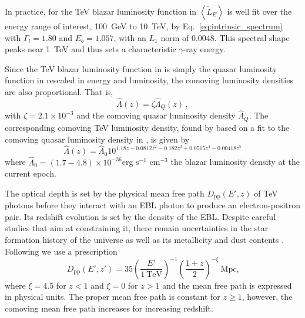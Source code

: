 \documentclass[numberedappendix]{emulateapj}
\begin{document}
In practice, for the TeV blazar luminosity function in
\citet{2014ApJ...790..137B} $\left< \tilde{L}_E \right>$ is well fit
over the energy range of interest, 100~GeV to 10~TeV, by
Eq.~\eqref{eq:intrinsic_spectrum} with $\Gamma_l=1.80$ and $E_b=1.057$,
with an $L_1$ norm of 0.0048.  This spectral shape peaks near 1~TeV
and thus sets a characteristic $\gamma$-ray energy.

Since the TeV blazar luminosity function in
\citet{2014ApJ...790..137B} is simply the quasar luminosity function
in \citet{2007ApJ...654..731H} rescaled in energy and luminosity, the
comoving luminosity densities are also proportional.  That is,
\begin{equation}
\hat{\Lambda}(z) = \zeta \hat{\Lambda}_Q(z)\,,
\end{equation}
with $\zeta=2.1\times 10^{-3}$ and the comoving quasar luminosity
density $\hat{\Lambda}_Q$. The corresponding comoving TeV luminosity
density, found by \citet{2012ApJ...752...23C} based on a fit to the
comoving quasar luminosity density in \citet{2007ApJ...654..731H}, is
given by
\begin{equation}
\label{eq:phi_quasar}
\hat{\Lambda}(z)=\hat{\Lambda}_0 10^{1.18 z - 0.0812 z^2 - 0.182 z^3 + 0.0515 z^4 - 0.00418 z^5} 
\end{equation}
where 
$\hat{\Lambda}_0=(1.7-4.8)\times 10^{-36}$erg s$^{-1}$ cm$^{-3}$ the
blazar luminosity density at the current epoch. 



The optical depth is set by the physical mean free path $D_\mathrm{pp}(E',z)$ of TeV photons before they interact with an EBL photon to produce an electron-positron pair. Its redshift evolution is set by the density of the EBL. Despite careful studies that aim at constraining it, there remain uncertainties in the star formation history of the universe as well as its metallicity and dust contents \citep[see, e.g.][]{2008A&A...487..837F,2006ApJ...648..774S}. Following \citet{2012ApJ...752...23C} we use a prescription
\begin{equation}
\label{eq:mean_free_path}
D_{\mathrm{pp}}(E',z')=35\left(\frac{E'}{1~\textrm{TeV}}\right)^{-1} \left(\frac{1+z}{2}\right)^{-\xi}~\textrm{Mpc,}
\end{equation}
where $\xi=4.5$ for $z<1$ and $\xi=0$ for $z>1$ \citep{2004A&A...413..807K,2009PhRvD..80l3012N} and the mean free path is expressed in physical units. The proper mean free path is constant for $z\geq 1$, however, the comoving mean free path increases for increasing redshift.
\end{document}
